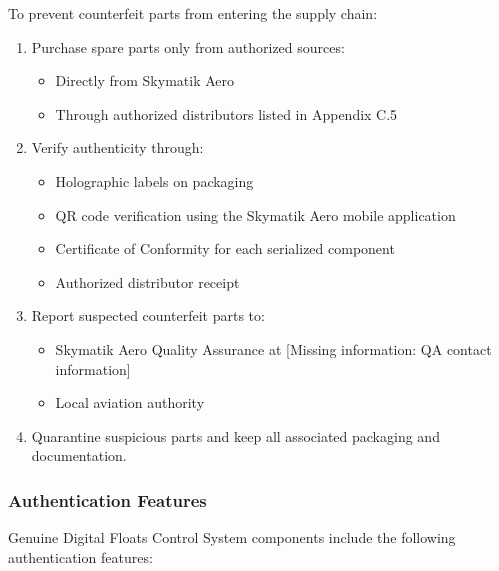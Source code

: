 \documentclass[12pt,a4paper,twoside,openright]{book}
\begin{document}
To prevent counterfeit parts from entering the supply chain:

\begin{enumerate}
    \item Purchase spare parts only from authorized sources:
    \begin{itemize}
        \item Directly from Skymatik Aero
        \item Through authorized distributors listed in Appendix C.5
    \end{itemize}
    
    \item Verify authenticity through:
    \begin{itemize}
        \item Holographic labels on packaging
        \item QR code verification using the Skymatik Aero mobile application
        \item Certificate of Conformity for each serialized component
        \item Authorized distributor receipt
    \end{itemize}
    
    \item Report suspected counterfeit parts to:
    \begin{itemize}
        \item Skymatik Aero Quality Assurance at {\color{missingred}[Missing information: QA contact information]}
        \item Local aviation authority
    \end{itemize}
    
    \item Quarantine suspicious parts and keep all associated packaging and documentation.
\end{enumerate}

\subsubsection{Authentication Features}

Genuine Digital Floats Control System components include the following authentication features:
\end{document}
